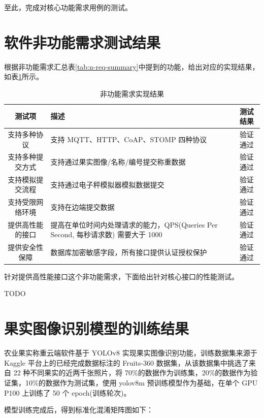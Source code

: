 至此，完成对核心功能需求用例的测试。

\section{软件非功能需求测试结果}

根据非功能需求汇总表\ref{tab:n-req-summary}中提到的功能，给出对应的实现结果，如表\ref{tab:test-n-req-summary}所示。

\begin{longtable}[ht]{|c|p{8cm}|c|}
\caption{非功能需求实现结果}
\label{tab:test-n-req-summary}
\\
\hline
测试项 & 描述 & 测试结果 \\\hline
支持多种协议 & 支持 MQTT、HTTP、CoAP、STOMP 四种协议 & 验证通过 \\\hline
支持多种提交方式 & 支持通过果实图像/名称/编号提交称重数据 & 验证通过 \\\hline
支持模拟提交流程 & 支持通过电子秤模拟器模拟数据提交 & 验证通过 \\\hline
支持受限网络环境 & 支持在边端提交数据 & 验证通过 \\\hline
提供高性能的接口 & 提高在单位时间内处理请求的能力，QPS(Queries Per Second, 每秒请求数) 需要大于 1000 & 验证通过 \\\hline
提供安全性保障 & 数据库加密敏感字段，所有接口提供认证授权保护 & 验证通过 \\\hline
\end{longtable}

针对提供高性能接口这个非功能需求，下面给出针对核心接口的性能测试。

TODO

\section{果实图像识别模型的训练结果}\label{sec:test-model}

农业果实称重云端软件基于 YOLOv8 实现果实图像识别功能，训练数据集来源于 Kaggle 平台上的已经完成数据标注的 Fruits-360 数据集，从该数据集中挑选了来自 22 种不同果实的近两千张照片，将 70\%的数据作为训练集，20\%的数据作为验证集，10\%的数据作为测试集，使用 yolov8m 预训练模型作为基础，在单个 GPU P100 上训练了 50 个 epoch(训练轮次)。

模型训练完成后，得到标准化混淆矩阵图如下：

